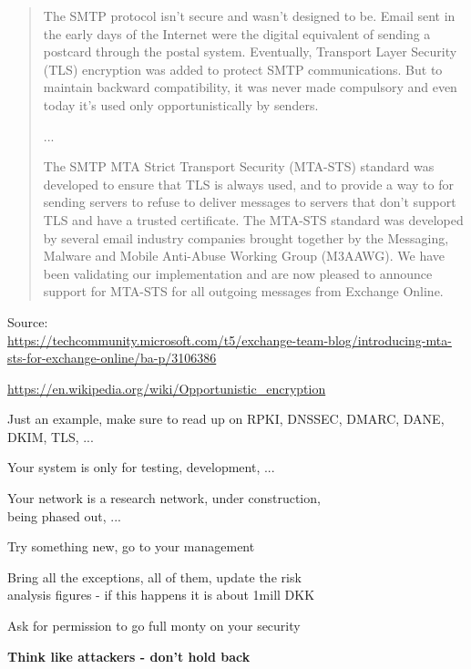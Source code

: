\documentclass[Screen16to9,17pt]{foils}
\begin{document}
\begin{quote}\footnotesize
The SMTP protocol isn’t secure and wasn’t designed to be. Email sent in the early days of the Internet were the digital equivalent of sending a postcard through the postal system. Eventually, Transport Layer Security (TLS) encryption was added to protect SMTP communications. But to maintain backward compatibility, it was never made compulsory and even today it’s used only opportunistically by senders.

...

The SMTP MTA Strict Transport Security (MTA-STS) standard was developed to ensure that TLS is always used, and to provide a way to for sending servers to refuse to deliver messages to servers that don’t support TLS and have a trusted certificate. The MTA-STS standard was developed by several email industry companies brought together by the Messaging, Malware and Mobile Anti-Abuse Working Group (M3AAWG). We have been validating our implementation and are now pleased to announce support for MTA-STS for all outgoing messages from Exchange Online.
\end{quote}
Source:\\
 {\scriptsize\url{https://techcommunity.microsoft.com/t5/exchange-team-blog/introducing-mta-sts-for-exchange-online/ba-p/3106386}}

\begin{list2}
\item \url{https://en.wikipedia.org/wiki/Opportunistic_encryption}
\item Just an example, make sure to read up on RPKI, DNSSEC, DMARC, DANE, DKIM, TLS, ...
\end{list2}



Your system is only for testing, development, ...

Your network is a research network, under construction, \\
being phased out, ...

Try something new, go to your management

Bring all the exceptions, all of them, update the risk \\
analysis figures - if this happens it is about 1mill DKK

Ask for permission to go full monty on your security

{\bf Think like attackers - don't hold back}


\end{document}
